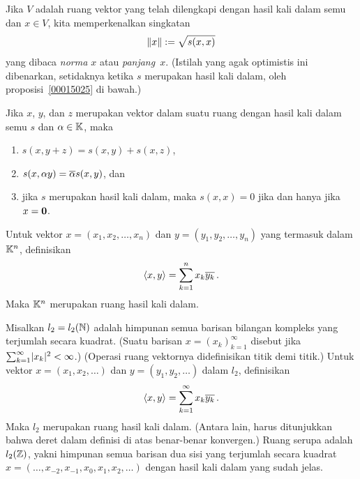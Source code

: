 \begin{notn}\label{norm_notn} Jika $V$ adalah ruang vektor yang telah dilengkapi dengan
hasil kali dalam semu dan $x \in V$, kita memperkenalkan singkatan
  \[ \lVert x\rVert := \sqrt{s(x,x)} \]
yang dibaca \emph{norma $x$} atau \emph{panjang~$x$}. (Istilah yang agak
optimistis ini dibenarkan, setidaknya ketika $s$ merupakan hasil kali dalam, oleh proposisi~\ref{00015025} di bawah.)
\end{notn}

\begin{prop}\label{00015001} Jika $x$, $y$, dan $z$ merupakan vektor dalam suatu ruang dengan hasil kali dalam semu $s$ dan $\alpha \in \mathbb{K}$, maka
 \begin{enumerate}[label=\rm{(\alph*)}]
   \item $s(x,y + z)  = s(x,y) + s(x,z)$,
   \item $s(x,\alpha y) = \overline{\alpha} s(x,y)$, dan
   \item jika $s$ merupakan hasil kali dalam, maka $s(x,x) = 0$ jika dan hanya jika $x = \mathbf{0}$.
 \end{enumerate}
\end{prop}

\begin{exam}\label{000150012} Untuk vektor $x = (x_1,x_2,\dots,x_n)$ dan $y = (y_1,y_2,\dots,y_n)$
yang termasuk dalam $\mathbb{K}^n$, definisikan
   \[ \langle x,y \rangle = \sum_{k=1}^n x_k \overline{y_k}\,. \]
Maka
$\mathbb{K}^n$ merupakan ruang hasil kali dalam.
\end{exam}

\begin{exam}\label{000150013} Misalkan $l_2 = l_2(\mathbb{N})$ adalah himpunan semua barisan bilangan
kompleks yang terjumlah secara kuadrat. (Suatu barisan $x = (x_k)_{k=1}^\infty$ disebut
 jika $\sum_{k=1}^\infty \lvert x_k\rvert^2 < \infty$.) (Operasi ruang vektornya didefinisikan
titik demi titik.) Untuk vektor $x = (x_1,x_2,\dots)$ dan $y = (y_1,y_2,\dots)$ dalam $l_2$, definisikan
   \[ \langle x,y \rangle = \sum_{k=1}^\infty x_k \overline{y_k}\,. \]
Maka $l_2$ merupakan ruang hasil kali dalam. (Antara lain, harus ditunjukkan bahwa
deret dalam definisi di atas benar-benar konvergen.) Ruang serupa adalah $l_2(\mathbb{Z})$, yakni himpunan semua
barisan dua sisi yang terjumlah secara kuadrat $x = (\dots,x_{-2},x_{-1},x_0,x_1,x_2,\dots)$ dengan hasil kali dalam yang sudah jelas.
\end{exam}

